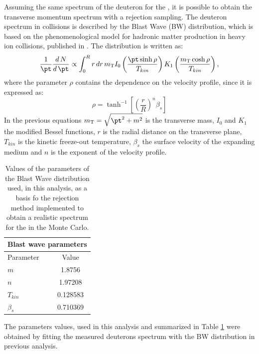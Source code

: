 Assuming the same \pt spectrum of the deuteron for the \ds, it is possible to obtain the \ds 
transverse momentum spectrum with a rejection sampling. The deuteron spectrum in \pPb collisions is
described by the Blast Wave (BW) distribution, which is based on the phenomenological model for
hadronic matter production in heavy ion collisions, published in \cite{blastwave}.
The distribution is written as:
\begin{equation}
    \frac{1}{\pt} \frac{d\,N}{d\,\pt} \propto \int_{0}^{R} r\,dr\,m_{\mathrm{T}} I_{0}
    \left( \frac{\pt \sinh\rho}{T_{kin}} \right) K_{1} \left( \frac{m_{\mathrm{T}} \cosh\rho}
    {T_{kin}} \right),
\end{equation}
where the parameter $\rho$ contains the dependence on the velocity profile, since it is expressed
as:
\begin{equation}
    \rho = \tanh^{-1} \left[ \left( \frac{r}{R} \right)^{n} \beta_{s} \right]
\end{equation}
In the previous equations $m_{\mathrm{T}} = \sqrt{\pt^{2} + m^{2}}$ is the transverse mass,
$I_{0}$ and $K_{1}$ the modified Bessel functions, $r$ is the radial distance on the transverse plane,
$T_{kin}$ is the kinetic freeze-out temperature, $\beta_{s}$  the surface velocity of the expanding 
medium and $n$ is the exponent of the velocity profile.
\begingroup
\renewcommand{\arraystretch}{1.5} %
\begin{table}
\centering
\begin{tabular}{lc}
\multicolumn{2}{c}{\textbf{Blast wave parameters}} \\
\toprule
Parameter       &   Value            \\
\midrule
$m$			    &	1.8756 \gevcs    \\
$n$             &   1.97208          \\
$T_{kin}$       &   0.128583         \\
$\beta_{s}$     &   0.710369         \\
\midrule
\end{tabular}
\caption{Values of the parameters of the Blast Wave distribution used, in this analysis, as a basis fo the rejection method implemented to obtain a realistic spectrum for the \ds in the Monte Carlo.}
\label{tab:bw_param}
\end{table}
\endgroup
The parameters values, used in this analysis and summarized in Table \ref{tab:bw_param}
were obtained by fitting the measured deuterons spectrum with the BW distribution in previous
analysis.

